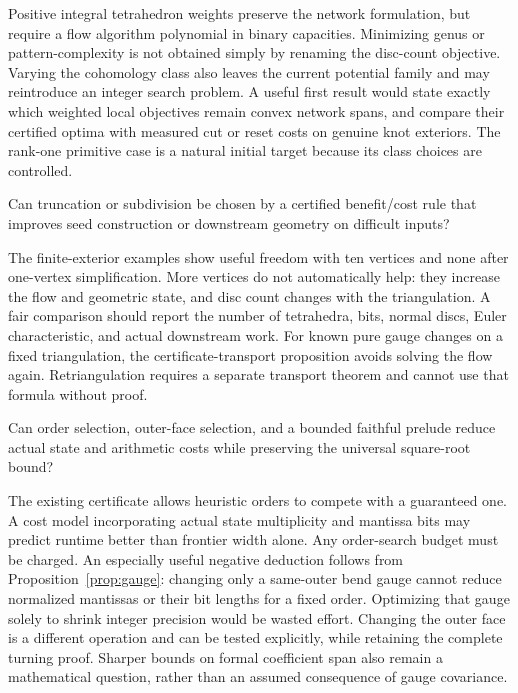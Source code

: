 Positive integral tetrahedron weights preserve the network formulation, but
require a flow algorithm polynomial in binary capacities. Minimizing genus
or pattern-complexity is not obtained simply by renaming the disc-count
objective. Varying the cohomology class also leaves the current potential
family and may reintroduce an integer search problem. A useful first result
would state exactly which weighted local objectives remain convex network
spans, and compare their certified optima with measured cut or reset costs
on genuine knot exteriors. The rank-one primitive case is a natural initial
target because its class choices are controlled.

\begin{question}
Can truncation or subdivision be chosen by a certified benefit/cost rule
that improves seed construction or downstream geometry on difficult inputs?
\end{question}

The finite-exterior examples show useful freedom with ten vertices and none
after one-vertex simplification. More vertices do not automatically help:
they increase the flow and geometric state, and disc count changes with the
triangulation. A fair comparison should report the number of tetrahedra,
bits, normal discs, Euler characteristic, and actual downstream work. For
known pure gauge changes on a fixed triangulation, the certificate-transport
proposition avoids solving the flow again. Retriangulation requires a
separate transport theorem and cannot use that formula without proof.

\begin{question}
Can order selection, outer-face selection, and a bounded faithful prelude
reduce actual state and arithmetic costs while preserving the universal
square-root bound?
\end{question}

The existing certificate allows heuristic orders to compete with a guaranteed
one. A cost model incorporating actual state multiplicity and mantissa bits
may predict runtime better than frontier width alone. Any order-search
budget must be charged. An especially useful negative deduction follows
from Proposition~\ref{prop:gauge}: changing only a same-outer bend gauge
cannot reduce normalized mantissas or their bit lengths for a fixed order.
Optimizing that gauge solely to shrink integer precision would be wasted
effort. Changing the outer face is a different operation and can be tested
explicitly, while retaining the complete turning proof. Sharper bounds on
formal coefficient span also remain a mathematical question, rather than
an assumed consequence of gauge covariance.

